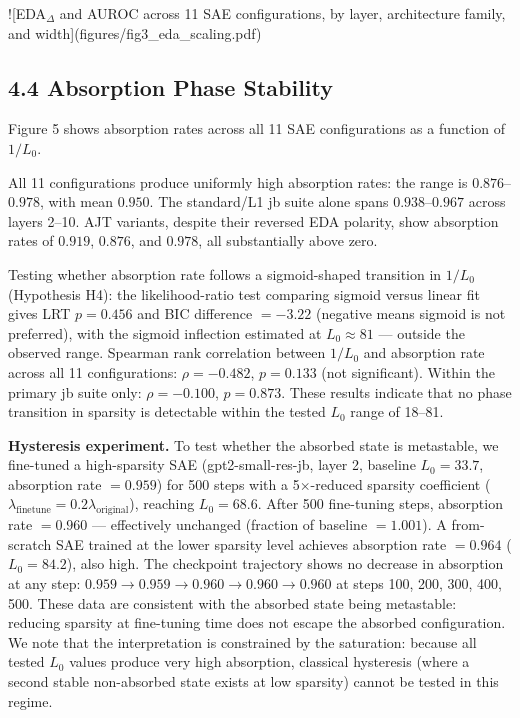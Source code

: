 \documentclass{article}
\begin{document}
![EDA$_\Delta$ and AUROC across 11 SAE configurations, by layer, architecture family, and width](figures/fig3_eda_scaling.pdf)

\subsection{4.4 Absorption Phase Stability}

Figure 5 shows absorption rates across all 11 SAE configurations as a function of $1/L_0$.

All 11 configurations produce uniformly high absorption rates: the range is $0.876$–$0.978$,
with mean $0.950$.
The standard/L1 jb suite alone spans $0.938$–$0.967$ across layers 2–10.
AJT variants, despite their reversed EDA polarity, show absorption rates of $0.919$, $0.876$,
and $0.978$, all substantially above zero.

Testing whether absorption rate follows a sigmoid-shaped transition in $1/L_0$
(Hypothesis H4): the likelihood-ratio test comparing sigmoid versus linear fit gives
LRT $p = 0.456$ and BIC difference $= -3.22$ (negative means sigmoid is not preferred),
with the sigmoid inflection estimated at $L_0 \approx 81$ — outside the observed range.
Spearman rank correlation between $1/L_0$ and absorption rate across all 11 configurations:
$\rho = -0.482$, $p = 0.133$ (not significant).
Within the primary jb suite only: $\rho = -0.100$, $p = 0.873$.
These results indicate that no phase transition in sparsity is detectable within the tested
$L_0$ range of 18–81.

\textbf{Hysteresis experiment.} To test whether the absorbed state is metastable,
we fine-tuned a high-sparsity SAE (gpt2-small-res-jb, layer 2, baseline $L_0 = 33.7$,
absorption rate $= 0.959$) for 500 steps with a 5$\times$-reduced sparsity coefficient
($\lambda_\text{finetune} = 0.2\lambda_\text{original}$), reaching $L_0 = 68.6$.
After 500 fine-tuning steps, absorption rate $= 0.960$ — effectively unchanged
(fraction of baseline $= 1.001$).
A from-scratch SAE trained at the lower sparsity level achieves absorption rate $= 0.964$
($L_0 = 84.2$), also high.
The checkpoint trajectory shows no decrease in absorption at any step: $0.959 \to 0.959 \to
0.960 \to 0.960 \to 0.960$ at steps 100, 200, 300, 400, 500.
These data are consistent with the absorbed state being metastable: reducing sparsity at
fine-tuning time does not escape the absorbed configuration.
We note that the interpretation is constrained by the saturation: because all tested
$L_0$ values produce very high absorption, classical hysteresis (where a second stable
non-absorbed state exists at low sparsity) cannot be tested in this regime.
\end{document}

